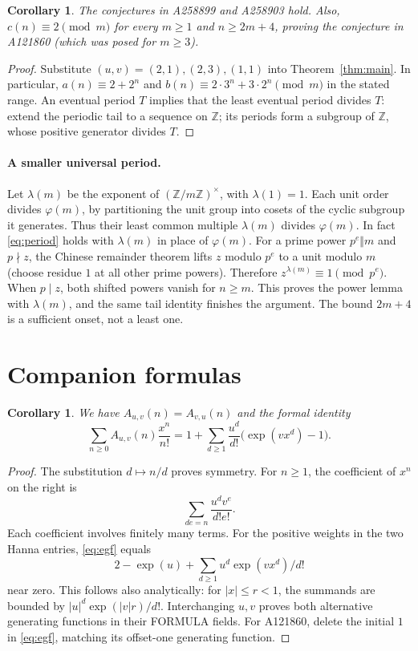 \documentclass[11pt]{article}
\newtheorem{corollary}[theorem]{Corollary}
\newcommand{\A}{A_{u,v}}
\begin{document}
\begin{corollary}\label{cor:oeis}
The conjectures in A258899 and A258903 hold. Also,
$c(n)\equiv2\pmod m$ for every $m\geq1$ and $n\geq2m+4$,
proving the conjecture in A121860 (which was posed for $m\geq3$).
\end{corollary}
\begin{proof}
Substitute $(u,v)=(2,1),(2,3),(1,1)$ into Theorem~\ref{thm:main}.
In particular, $a(n)\equiv2+2^n$ and
$b(n)\equiv2\cdot3^n+3\cdot2^n\pmod m$ in the stated range.
An eventual period $T$ implies that the least eventual period divides $T$:
extend the periodic tail to a sequence on $\mathbb Z$; its periods form
a subgroup of $\mathbb Z$, whose positive generator divides $T$.
\end{proof}

\paragraph{A smaller universal period.}
Let $\lambda(m)$ be the exponent of $(\mathbb Z/m\mathbb Z)^\times$,
with $\lambda(1)=1$. Each unit order divides $\varphi(m)$, by partitioning
the unit group into cosets of the cyclic subgroup it generates. Thus their
least common multiple $\lambda(m)$ divides $\varphi(m)$.
In fact \eqref{eq:period} holds with $\lambda(m)$ in place of $\varphi(m)$.
For a prime power $p^e\Vert m$ and $p\nmid z$, the Chinese remainder
theorem lifts $z$ modulo $p^e$ to a unit modulo $m$ (choose residue $1$
at all other prime powers). Therefore $z^{\lambda(m)}\equiv1\pmod{p^e}$.
When $p\mid z$, both shifted powers vanish for $n\geq m$.
This proves the power lemma with $\lambda(m)$, and the same tail identity
finishes the argument. The bound $2m+4$ is a sufficient onset, not a least one.

\section{Companion formulas}
\begin{corollary}\label{cor:egf}
We have $A_{u,v}(n)=A_{v,u}(n)$ and the formal identity
\begin{equation}\label{eq:egf}
 \sum_{n\geq0}\A(n)\frac{x^n}{n!}
 =1+\sum_{d\geq1}\frac{u^d}{d!}\bigl(\exp(vx^d)-1\bigr).
\end{equation}
\end{corollary}
\begin{proof}
The substitution $d\mapsto n/d$ proves symmetry. For $n\geq1$,
the coefficient of $x^n$ on the right is
\[
 \sum_{de=n}\frac{u^dv^e}{d!e!}.
\]
Each coefficient involves finitely many terms.
For the positive weights in the two Hanna entries,
\eqref{eq:egf} equals
\[
 2-\exp(u)+\sum_{d\geq1}u^d\exp(vx^d)/d!
\]
near zero.
This follows also analytically: for $|x|\leq r<1$, the summands are
bounded by $|u|^d\exp(|v|r)/d!$.
Interchanging $u,v$ proves both alternative generating functions in their
FORMULA fields. For A121860, delete the initial $1$ in
\eqref{eq:egf}, matching its offset-one generating function.

\end{proof}

\end{document}
